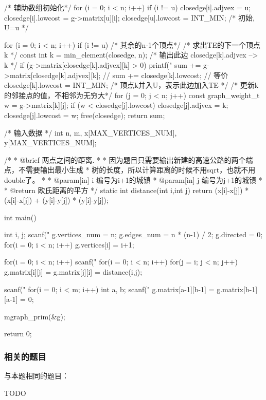 \begin{Codex}[label=poj_1751_highways_prim.c]
{    /* 辅助数组初始化*/
    for (i = 0; i < n; i++) if (i != u) {
        closedge[i].adjvex = u;
        closedge[i].lowcost = g->matrix[u][i];
    }
    closedge[u].lowcost = INT_MIN; /* 初始, U={u} */

    for (i = 0; i < n; i++) if (i != u) { /* 其余的n-1个顶点*/
        /* 求出TE的下一个顶点k */
        const int k = min_element(closedge, n);
        /* 输出此边 closedge[k].adjvex --> k */
        if (g->matrix[closedge[k].adjvex][k] > 0)
            printf("%
        sum += g->matrix[closedge[k].adjvex][k];
        // sum += closedge[k].lowcost;  // 等价
        closedge[k].lowcost = INT_MIN;  /* 顶点k并入U，表示此边加入TE */
        /* 更新k的邻接点的值，不相邻为无穷大*/
        for (j = 0; j < n; j++) {
            const graph_weight_t w = g->matrix[k][j];
            if (w < closedge[j].lowcost) {
                closedge[j].adjvex = k;
                closedge[j].lowcost = w;
            }
        }
    }
    free(closedge);
    return sum;
}

/* 输入数据 */
int n, m, x[MAX_VERTICES_NUM], y[MAX_VERTICES_NUM];

/*
 * @brief 两点之间的距离.
 *
 * 因为题目只需要输出新建的高速公路的两个端点，不需要输出最小生成
 * 树的长度，所以计算距离的时候不用sqrt，也就不用double了。
 *
 * @param[in] i 编号为i+1的城镇
 * @param[in] j 编号为j+1的城镇
 *
 * @return 欧氏距离的平方
 */
static int distance(int i,int j) {
    return (x[i]-x[j]) * (x[i]-x[j]) + (y[i]-y[j]) * (y[i]-y[j]);
}

int main() {
    int i, j;
    scanf("%
    g.vertices_num = n;
    g.edges_num = n * (n-1) / 2;
    g.directed = 0;
    for(i = 0; i < n; i++) g.vertices[i] = i+1;

    for(i = 0; i < n; i++) scanf("%
    for(i = 0; i < n; i++)
        for(j = i; j < n; j++)
            g.matrix[i][j] = g.matrix[j][i] = distance(i,j);

    scanf("%
    for(i = 0; i < m; i++) {
        int a, b;
        scanf("%
        g.matrix[a-1][b-1] = g.matrix[b-1][a-1] = 0;
    }

    mgraph_prim(&g);

    return 0;
}
\end{Codex}

\subsubsection{相关的题目}
与本题相同的题目：
\begindot
\item TODO
\myenddot

